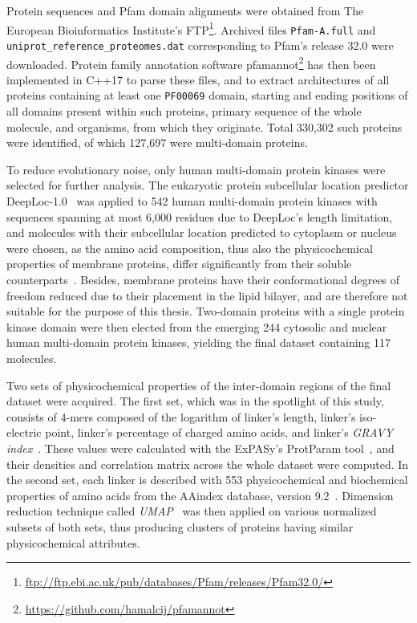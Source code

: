 \label{methods}

Protein sequences and Pfam domain alignments were obtained from The European
Bioinformatics Institute's
FTP\footnote{\url{ftp://ftp.ebi.ac.uk/pub/databases/Pfam/releases/Pfam32.0/}}.
Archived files \texttt{Pfam-A.full} and \texttt{uniprot\_reference\_proteomes.dat}
corresponding to Pfam's release 32.0 were downloaded.
Protein family annotation software
pfamannot\footnote{\url{https://github.com/hamalcij/pfamannot}} has then been implemented
in C++17 to parse these files, and to extract architectures of all proteins containing at
least one \texttt{PF00069} domain, starting and ending positions of all domains present
within such proteins, primary sequence of the whole molecule, and organisms, from which
they originate.
Total 330,302 such proteins were identified, of which 127,697 were multi-domain proteins.

To reduce evolutionary noise, only human multi-domain protein kinases were selected for
further analysis.
The eukaryotic protein subcellular location predictor
DeepLoc-1.0~\cite{almagro2017deeploc} was applied to 542 human multi-domain protein
kinases with sequences spanning at most 6,000 residues due to DeepLoc's length limitation,
and molecules with their subcellular location predicted to cytoplasm or nucleus were
chosen, as the amino acid composition, thus also the physicochemical properties of
membrane proteins, differ significantly from their soluble
counterparts~\cite{capaldi1972low, von1988topogenic, tusnady1998principles}.
Besides, membrane proteins have their conformational degrees of freedom reduced due to
their placement in the lipid bilayer, and are therefore not suitable for the purpose of
this thesis.
Two-domain proteins with a single protein kinase domain were then elected from the
emerging 244 cytosolic and nuclear human multi-domain protein kinases, yielding the final
dataset containing 117 molecules.

Two sets of physicochemical properties of the inter-domain regions of the final
dataset were acquired.
The first set, which was in the spotlight of this study, consists of 4-mers composed of
the logarithm of linker's length, linker's iso-electric point, linker's percentage of
charged amino acids, and linker's \emph{GRAVY index}~\cite{kyte1982simple}.
These values were calculated with the ExPASy's ProtParam tool~\cite{gasteiger2005protein},
and their densities and correlation matrix across the whole dataset were computed.
In the second set, each linker is described with 553 physicochemical and
biochemical properties of amino acids from the AAindex database, version
9.2~\cite{nakai1988cluster, tomii1996analysis, kawashima1999aaindex, kawashima2000aaindex,
kawashima2007aaindex}.
Dimension reduction technique called \emph{UMAP}~\cite{mcinnes2018umap} was then applied
on various normalized subsets of both sets, thus producing clusters of proteins having
similar physicochemical attributes.

